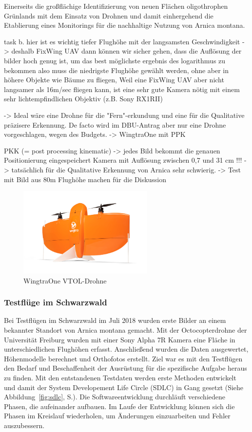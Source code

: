 Einerseits die großflächige Identifizierung von neuen Flächen oligothrophen Grünlands mit dem Einsatz von Drohnen und damit einhergehend die Etablierung eines Monitorings für die nachhaltige Nutzung von Arnica montana.

task b.
hier ist es wichtig tiefer Flughöhe mit der langsamsten Geschwindigkeit -> deshalb FixWing UAV
dann können wir sicher gehen, dass die Auflösung der bilder hoch genug ist, um das best möglichste ergebnis des logarithmus zu bekommen
also muss die niedrigste Flughöhe gewählt werden, ohne aber in höhere Objekte wie Bäume zu fliegen, Weil eine FixWing UAV aber nicht langsamer als 16m/sec fliegen kann, ist eine sehr gute Kamera nötig mit einem sehr lichtempfindlichen Objektiv (z.B. Sony RX1RII)

-> Ideal wäre eine Drohne für die "Fern"-erkundung und eine für die Qualitative präzisere Erkennung. De facto wird im DBU-Antrag aber nur eine Drohne vorgeschlagen, wegen des Budgets. -> WingtraOne mit PPK

PKK (= post processing kinematic) -> jedes Bild bekommt die genauen Positionierung eingespeichert 
Kamera mit Auflösung zwischen 0,7 und 31 cm !!! -> tatsächlich für die Qualitative Erkennung von Arnica sehr schwierig. -> Test mit Bild aus 80m Flughöhe machen für die Diskussion

\begin{figure}[htb]
 \centering
  \includegraphics[width=0.6\textwidth,angle=0]{abb/drohnen/wingtraone}
 \caption{WingtraOne VTOL-Drohne}
\label{fig:wingtraone}
\end{figure}

\subsubsection{Testflüge im Schwarzwald}

Bei Testflügen im Schwarzwald im Juli 2018 wurden erste Bilder an einem bekannter Standort von Arnica montana gemacht. Mit der Octocopterdrohne der Universität Freiburg wurden mit einer Sony Alpha 7R Kamera eine Fläche in unterschiedlichen Flughöhen erfasst. Anschließend wurden die Daten ausgewertet, Höhenmodelle berechnet und Orthofotos erstellt. Ziel war es mit den Testflügen den Bedarf und Beschaffenheit der Ausrüstung für die spezifische Aufgabe heraus zu finden. Mit den entstandenen Testdaten werden erste Methoden entwickelt und damit der System Developement Life Circle (SDLC) in Gang gesetzt (Siehe Abbildung~\ref{fig:sdlc}, S.\pageref{fig:sdlc}). Die Softwareentwicklung durchläuft verschiedene Phasen, die aufeinander aufbauen. Im Laufe der Entwicklung können sich die Phasen im Kreislauf wiederholen, um Änderungen einzuarbeiten und Fehler auszubessern. 

